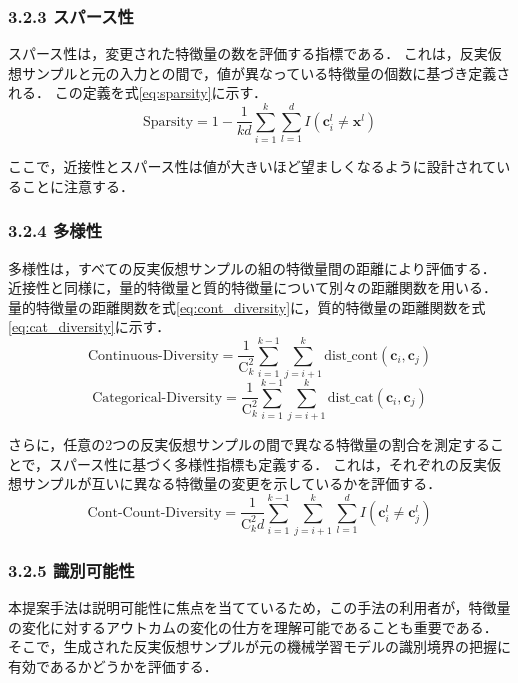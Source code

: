 \documentclass[dvipdfmx]{jreport}
\begin{document}
\subsubsection{3.2.3 スパース性}
スパース性は，変更された特徴量の数を評価する指標である．
これは，反実仮想サンプルと元の入力との間で，値が異なっている特徴量の個数に基づき定義される．
この定義を式\eqref{eq:sparsity}に示す．
\begin{equation}
\text{Sparsity} = 1 - \frac{1}{kd} \sum_{i=1}^{k} \sum_{l=1}^{d} \textit{I}(\bm{c}_i^l \ne \bm{x}^l) \label{eq:sparsity}
\end{equation}

ここで，近接性とスパース性は値が大きいほど望ましくなるように設計されていることに注意する．

\subsubsection{3.2.4 多様性}
多様性は，すべての反実仮想サンプルの組の特徴量間の距離により評価する．
近接性と同様に，量的特徴量と質的特徴量について別々の距離関数を用いる．
量的特徴量の距離関数を式\eqref{eq:cont_diversity}に，質的特徴量の距離関数を式\eqref{eq:cat_diversity}に示す．
\begin{equation}
\text{Continuous-Diversity} = \frac{1}{\text{C}_k^2} \sum_{i=1}^{k-1} \sum_{j=i+1}^{k} \text{dist\_cont}(\bm{c}_i, \bm{c}_j) \label{eq:cont_diversity}
\end{equation}
\begin{equation}
\text{Categorical-Diversity} = \frac{1}{\text{C}_k^2} \sum_{i=1}^{k-1} \sum_{j=i+1}^{k} \text{dist\_cat}(\bm{c}_i, \bm{c}_j) \label{eq:cat_diversity}
\end{equation}

さらに，任意の2つの反実仮想サンプルの間で異なる特徴量の割合を測定することで，スパース性に基づく多様性指標も定義する．
これは，それぞれの反実仮想サンプルが互いに異なる特徴量の変更を示しているかを評価する．
\begin{equation}
\text{Cont-Count-Diversity} = \frac{1}{\text{C}_k^2d} \sum_{i=1}^{k-1} \sum_{j=i+1}^{k} \sum_{l=1}^{d} \textit{I}(\bm{c}_i^l \ne \bm{c}_j^l)
\end{equation}

\subsubsection{3.2.5 識別可能性} \label{sec:boundary_understanding}
本提案手法は説明可能性に焦点を当てているため，この手法の利用者が，特徴量の変化に対するアウトカムの変化の仕方を理解可能であることも重要である．
そこで，生成された反実仮想サンプルが元の機械学習モデルの識別境界の把握に有効であるかどうかを評価する．
\end{document}

